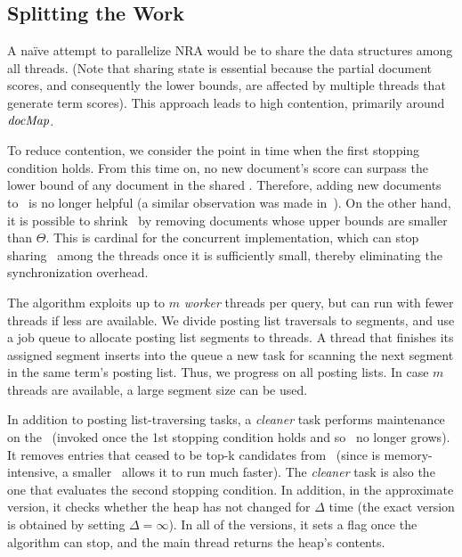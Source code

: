 \subsection{Splitting the Work}
\label{sssec:tasks}

A na\"ive attempt to parallelize NRA would be to 
share the data structures among all threads. (Note that sharing state is essential because the partial document scores, and consequently the lower bounds, are affected by multiple threads that generate term scores). This approach 
leads to high contention, primarily around $\textit{docMap}$.

To reduce contention, we 
consider the point in time when the first stopping condition holds. From this time on, no new document's score can surpass the lower bound of any document in the shared \DHeap. Therefore, adding new documents to \DMap\ is no longer helpful (a similar observation was made  in~\cite{Mamoulis:2007}). 
On the other hand, it is possible to shrink \DMap\ by removing documents whose upper bounds are smaller than $\Theta$.
This is cardinal for the concurrent implementation, which can stop sharing \DMap\ among the threads once it is sufficiently small, thereby eliminating the synchronization overhead. 



%

The algorithm exploits up to $m$ {\em worker\/} threads per query, but can run with fewer threads if less are available. 
We divide posting list traversals to segments, and use a job queue to allocate posting list segments to threads. 
A  thread that finishes its assigned segment inserts into the queue a new task for scanning the next segment in the same term's posting list. Thus, we  progress on all posting lists. 
In case $m$ threads are available, a large segment size can be used.

In addition to  posting list-traversing tasks, a \emph{cleaner} task performs maintenance on the \DMap\ (invoked once the 1st stopping condition holds and so \DMap\ no longer grows). 
It removes entries that ceased to be top-k candidates from \DMap\ (since \alg\/ is memory-intensive, a smaller \DMap\ allows it to run much faster).
The \emph{cleaner} task is also the one that evaluates the second stopping condition.
In addition, in the approximate version, it checks whether the heap has not changed for $\Delta$ time 
(the exact version is obtained by setting $\Delta=\infty$). In all of the versions, it sets a flag once the algorithm can stop, and the main thread returns the heap's contents. 

